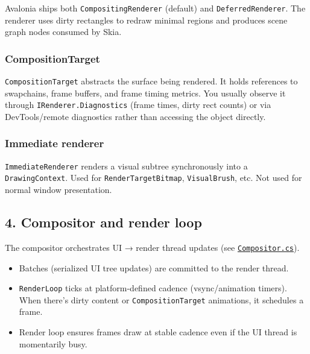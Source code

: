 Avalonia ships both \passthrough{\lstinline!CompositingRenderer!}
(default) and \passthrough{\lstinline!DeferredRenderer!}. The renderer
uses dirty rectangles to redraw minimal regions and produces scene graph
nodes consumed by Skia.

\subsubsection{CompositionTarget}\label{compositiontarget}

\passthrough{\lstinline!CompositionTarget!} abstracts the surface being
rendered. It holds references to swapchains, frame buffers, and frame
timing metrics. You usually observe it through
\passthrough{\lstinline!IRenderer.Diagnostics!} (frame times, dirty rect
counts) or via DevTools/remote diagnostics rather than accessing the
object directly.

\subsubsection{Immediate renderer}\label{immediate-renderer}

\passthrough{\lstinline!ImmediateRenderer!} renders a visual subtree
synchronously into a \passthrough{\lstinline!DrawingContext!}. Used for
\passthrough{\lstinline!RenderTargetBitmap!},
\passthrough{\lstinline!VisualBrush!}, etc. Not used for normal window
presentation.

\subsection{4. Compositor and render
loop}\label{compositor-and-render-loop}

The compositor orchestrates UI → render thread updates (see
\href{https://github.com/AvaloniaUI/Avalonia/blob/master/src/Avalonia.Base/Rendering/Composition/Compositor.cs}{\passthrough{\lstinline!Compositor.cs!}}).

\begin{itemize}
\tightlist
\item
  Batches (serialized UI tree updates) are committed to the render
  thread.
\item
  \passthrough{\lstinline!RenderLoop!} ticks at platform-defined cadence
  (vsync/animation timers). When there's dirty content or
  \passthrough{\lstinline!CompositionTarget!} animations, it schedules a
  frame.
\item
  Render loop ensures frames draw at stable cadence even if the UI
  thread is momentarily busy.
\end{itemize}

